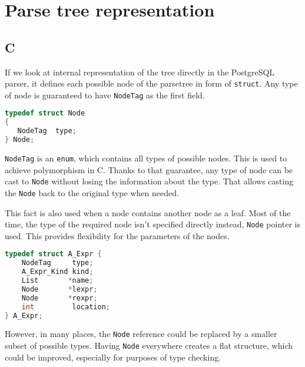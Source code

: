 \section{Parse tree representation}
\subsection{C}

If we look at internal representation of the tree directly in the PostgreSQL parser, it defines each possible node of the parsetree in form of \texttt{struct}. Any type of node is guaranteed to have \texttt{NodeTag} as the first field. 
\begin{lstlisting}[language=C, basicstyle=\ttfamily, caption={\texttt{Node} representation in PostgreSQL parser}]      
typedef struct Node
{
   NodeTag  type;
} Node;
\end{lstlisting}
\texttt{NodeTag} is an \texttt{enum}, which contains all types of possible nodes. This is used to achieve polymorphism in C. Thanks to that guarantee, any type of node can be cast to \texttt{Node} without losing the information about the type. That allows casting the \texttt{Node} back to the original type when needed.

This fact is also used when a node contains another node as a leaf. Most of the time, the type of the required node isn't specified directly instead, \texttt{Node} pointer is used. This provides flexibility for the parameters of the nodes. 

\begin{lstlisting}[language=C, basicstyle=\ttfamily, caption={\texttt{A\_Expr} representation in PostgreSQL parser}]      
typedef struct A_Expr {
    NodeTag     type;
    A_Expr_Kind kind;
    List       *name; 
    Node       *lexpr; 
    Node       *rexpr; 
    int         location; 
} A_Expr;
\end{lstlisting}

However, in many places, the \texttt{Node} reference could be replaced by a smaller subset of possible types. Having \texttt{Node} everywhere creates a flat structure, which could be improved, especially for purposes of type checking. 

